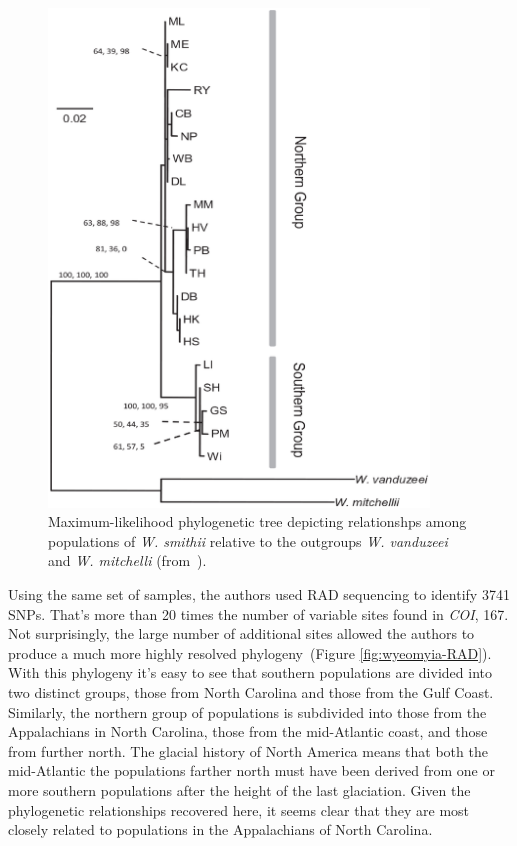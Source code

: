 \begin{figure}
\begin{center}
\includegraphics[width=0.9\textwidth]{wyeomyia-COI.eps}
\end{center}
\caption{Maximum-likelihood phylogenetic tree depicting relationshps
  among populations of {\it W. smithii\/} relative to the outgroups
  {\it W. vanduzeei\/} and {\it W. mitchelli} (from~\cite{Emerson-etal-2010}).}\label{fig:wyeomyia-COI}
\end{figure}

Using the same set of samples, the authors used RAD sequencing to
identify 3741 SNPs. That's more than 20 times the number of variable
sites found in {\it COI}, 167. Not surprisingly, the large number of
additional sites allowed the authors to produce a much more highly
resolved phylogeny~(Figure \ref{fig:wyeomyia-RAD}). With this
phylogeny it's easy to see that southern populations are divided into
two distinct groups, those from North Carolina and those from the Gulf
Coast. Similarly, the northern group of populations is subdivided into
those from the Appalachians in North Carolina, those from the
mid-Atlantic coast, and those from further north. The glacial history
of North America means that both the mid-Atlantic the populations
farther north must have been derived from one or more southern
populations after the height of the last glaciation. Given the
phylogenetic relationships recovered here, it seems clear that they
are most closely related to populations in the Appalachians of North
Carolina.

